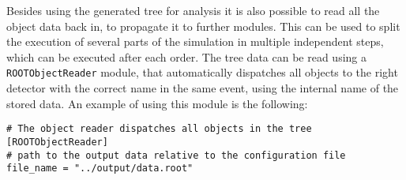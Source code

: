 Besides using the generated tree for analysis it is also possible to read all the object data back in, to propagate it to further modules. This can be used to split the execution of several parts of the simulation in multiple independent steps, which can be executed after each order. The tree data can be read using a \texttt{ROOTObjectReader} module, that automatically dispatches all objects to the right detector with the correct name in the same event, using the internal name of the stored data. An example of using this module is the following:
\begin{verbatim}
# The object reader dispatches all objects in the tree
[ROOTObjectReader]
# path to the output data relative to the configuration file
file_name = "../output/data.root"
\end{verbatim}

